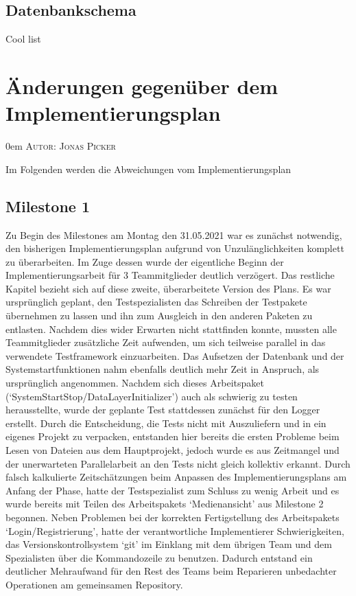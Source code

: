 \documentclass{article}
\makeatletter
\newcommand{\sectionauthor}[1]{
	{\parindent 0em \large \scshape Autor: #1 \par \nobreak \vspace*{1em}}
	\@afterheading
}
\makeatother
\begin{document}
\subsection{Datenbankschema}
Cool list

\section{Änderungen gegenüber dem Implementierungsplan}
\sectionauthor{Jonas Picker}
Im Folgenden werden die Abweichungen vom Implementierungsplan
\subsection{Milestone 1}
Zu Begin des Milestones am Montag den 31.05.2021 war es zunächst notwendig, den bisherigen Implementierungsplan aufgrund von Unzulänglichkeiten komplett zu überarbeiten. Im Zuge dessen wurde der eigentliche Beginn der Implementierungsarbeit für 3 Teammitglieder deutlich verzögert. Das restliche Kapitel bezieht sich auf diese zweite, überarbeitete Version des Plans. Es war ursprünglich geplant, den Testspezialisten das Schreiben der Testpakete übernehmen zu lassen und ihn zum Ausgleich in den anderen Paketen zu entlasten. Nachdem dies wider Erwarten nicht stattfinden konnte, mussten alle Teammitglieder zusätzliche Zeit aufwenden, um sich teilweise parallel in das verwendete Testframework einzuarbeiten. Das Aufsetzen der Datenbank und der Systemstartfunktionen nahm ebenfalls deutlich mehr Zeit in Anspruch, als ursprünglich angenommen. Nachdem sich dieses Arbeitspaket (`SystemStartStop/DataLayerInitializer') auch als schwierig zu testen herausstellte, wurde der geplante Test stattdessen zunächst für den Logger erstellt. Durch die Entscheidung, die Tests nicht mit Auszuliefern und in ein eigenes Projekt zu verpacken, entstanden hier bereits die ersten Probleme beim Lesen von Dateien aus dem Hauptprojekt, jedoch wurde es aus Zeitmangel und der unerwarteten Parallelarbeit an den Tests nicht gleich kollektiv erkannt. Durch falsch kalkulierte Zeitschätzungen beim Anpassen des Implementierungsplans am Anfang der Phase, hatte der Testspezialist zum Schluss zu wenig Arbeit und es wurde bereits mit Teilen des Arbeitspakets `Medienansicht' aus Milestone 2 begonnen. Neben Problemen bei der korrekten Fertigstellung des Arbeitspakets `Login/Registrierung', hatte der verantwortliche Implementierer Schwierigkeiten, das Versionskontrollsystem `git' im Einklang mit dem übrigen Team und dem Spezialisten über die Kommandozeile zu benutzen. Dadurch entstand ein deutlicher Mehraufwand für den Rest des Teams beim Reparieren unbedachter Operationen am gemeinsamen Repository.
\end{document}
